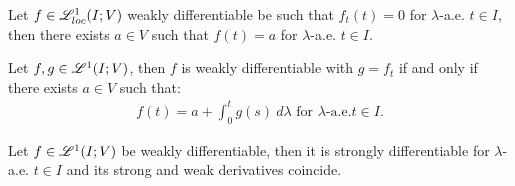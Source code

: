 \begin{lemma}
    Let $f \in \mathscr{L}^{1}_{loc}(I; V)$ weakly differentiable be such that $f_t(t) = 0$ for $\lambda$-a.e. $t \in I$, then there exists $a \in V$ such that $f(t) = a$ for $\lambda$-a.e. $t \in I$.
\end{lemma}

\begin{theorem}
    Let $f, g \in \mathscr{L}^{1}(I; V)$, then $f$ is weakly differentiable with $g = f_t$ if and only if there exists $a \in V$ such that:
    \begin{gather}
        f(t) = a + \int_0^t g(s) ~ d \lambda \text{ for } \lambda \text{-a.e.} t \in I.
    \end{gather}
\end{theorem}

\begin{corollary}
    Let $f \in \mathscr{L}^{1}(I; V)$ be weakly differentiable, then it is strongly differentiable for $\lambda$-a.e. $t \in I$ and its strong and weak derivatives coincide.
\end{corollary}